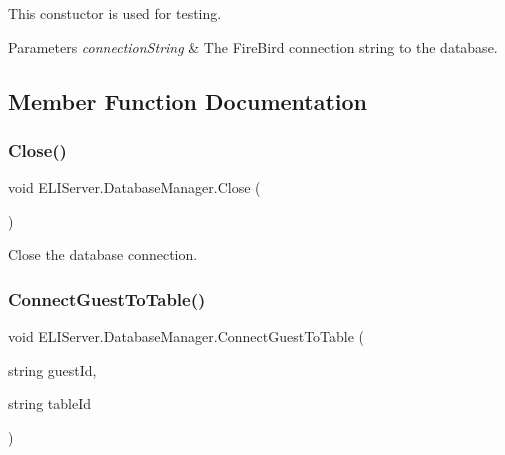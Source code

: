 This constuctor is used for testing. 


\begin{DoxyParams}{Parameters}
{\em connection\+String} & The Fire\+Bird connection string to the database.\\
\hline
\end{DoxyParams}


\subsection{Member Function Documentation}
\mbox{\label{class_e_l_i_server_1_1_database_manager_a7f64bd7fd49cd35e15362d2db5a302e0}} 
\subsubsection{\texorpdfstring{Close()}{Close()}}
{\footnotesize\ttfamily void E\+L\+I\+Server.\+Database\+Manager.\+Close (\begin{DoxyParamCaption}{ }\end{DoxyParamCaption})\hspace{0.3cm}{\ttfamily [inline]}}



Close the database connection. 

\mbox{\label{class_e_l_i_server_1_1_database_manager_a4167599aa3be67444134c0fd4f837c82}} 
\subsubsection{\texorpdfstring{Connect\+Guest\+To\+Table()}{ConnectGuestToTable()}}
{\footnotesize\ttfamily void E\+L\+I\+Server.\+Database\+Manager.\+Connect\+Guest\+To\+Table (\begin{DoxyParamCaption}\item[{string}]{guest\+Id,  }\item[{string}]{table\+Id }\end{DoxyParamCaption})\hspace{0.3cm}{\ttfamily [inline]}}




